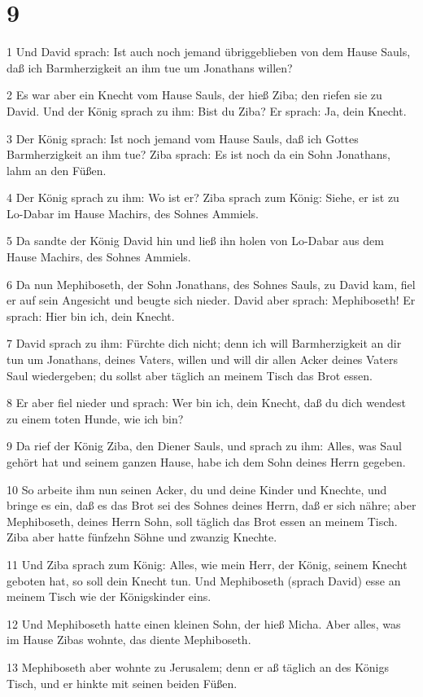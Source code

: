 \chapter{9}

\par 1 Und David sprach: Ist auch noch jemand übriggeblieben von dem Hause Sauls, daß ich Barmherzigkeit an ihm tue um Jonathans willen?
\par 2 Es war aber ein Knecht vom Hause Sauls, der hieß Ziba; den riefen sie zu David. Und der König sprach zu ihm: Bist du Ziba? Er sprach: Ja, dein Knecht.
\par 3 Der König sprach: Ist noch jemand vom Hause Sauls, daß ich Gottes Barmherzigkeit an ihm tue? Ziba sprach: Es ist noch da ein Sohn Jonathans, lahm an den Füßen.
\par 4 Der König sprach zu ihm: Wo ist er? Ziba sprach zum König: Siehe, er ist zu Lo-Dabar im Hause Machirs, des Sohnes Ammiels.
\par 5 Da sandte der König David hin und ließ ihn holen von Lo-Dabar aus dem Hause Machirs, des Sohnes Ammiels.
\par 6 Da nun Mephiboseth, der Sohn Jonathans, des Sohnes Sauls, zu David kam, fiel er auf sein Angesicht und beugte sich nieder. David aber sprach: Mephiboseth! Er sprach: Hier bin ich, dein Knecht.
\par 7 David sprach zu ihm: Fürchte dich nicht; denn ich will Barmherzigkeit an dir tun um Jonathans, deines Vaters, willen und will dir allen Acker deines Vaters Saul wiedergeben; du sollst aber täglich an meinem Tisch das Brot essen.
\par 8 Er aber fiel nieder und sprach: Wer bin ich, dein Knecht, daß du dich wendest zu einem toten Hunde, wie ich bin?
\par 9 Da rief der König Ziba, den Diener Sauls, und sprach zu ihm: Alles, was Saul gehört hat und seinem ganzen Hause, habe ich dem Sohn deines Herrn gegeben.
\par 10 So arbeite ihm nun seinen Acker, du und deine Kinder und Knechte, und bringe es ein, daß es das Brot sei des Sohnes deines Herrn, daß er sich nähre; aber Mephiboseth, deines Herrn Sohn, soll täglich das Brot essen an meinem Tisch. Ziba aber hatte fünfzehn Söhne und zwanzig Knechte.
\par 11 Und Ziba sprach zum König: Alles, wie mein Herr, der König, seinem Knecht geboten hat, so soll dein Knecht tun. Und Mephiboseth (sprach David) esse an meinem Tisch wie der Königskinder eins.
\par 12 Und Mephiboseth hatte einen kleinen Sohn, der hieß Micha. Aber alles, was im Hause Zibas wohnte, das diente Mephiboseth.
\par 13 Mephiboseth aber wohnte zu Jerusalem; denn er aß täglich an des Königs Tisch, und er hinkte mit seinen beiden Füßen.

